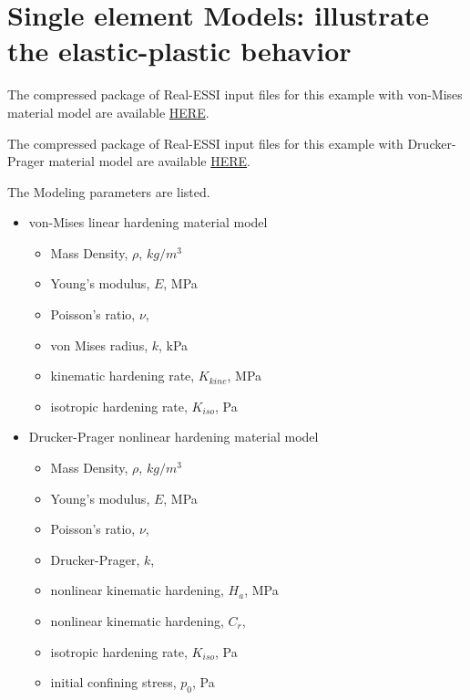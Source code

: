 \clearpage
\newpage
\section{Single element Models: illustrate the elastic-plastic behavior}
\label{Single_element_Models_illustrate_the_elastic-plastic_behavior}

The compressed package of Real-ESSI input files for this example with von-Mises material model are available 
\href{http://cml01.engr.ucdavis.edu/shortCourse/Day1/Single_element_Models_illustrate_the_elastic-plastic_behavior/vonMises/vonMises.tgz}{HERE}. 

The compressed package of Real-ESSI input files for this example with Drucker-Prager material model are available 
\href{http://cml01.engr.ucdavis.edu/shortCourse/Day1/Single_element_Models_illustrate_the_elastic-plastic_behavior/DruckerPrager/DruckerPrager.tgz}{HERE}. 



The Modeling parameters are listed.
\begin{itemize}
  \item von-Mises linear hardening material model 
  \begin{itemize}
    \item Mass Density, $\rho$, \enspace {} $kg/m^3$
    \item Young's modulus, $E$, \enspace {} MPa
    \item Poisson's ratio, $\nu$, \enspace {}
    \item von Mises radius, $k$, \enspace {} kPa
    \item kinematic hardening rate, $K_{kine} $, \enspace {} MPa
    \item isotropic hardening rate, $K_{iso} $, \enspace {} Pa
  \end{itemize}
  \item Drucker-Prager nonlinear hardening material model 
  \begin{itemize}
    \item Mass Density, $\rho$, \enspace {} $kg/m^3$
    \item Young's modulus, $E$, \enspace {} MPa
    \item Poisson's ratio, $\nu$, \enspace {}
    \item Drucker-Prager, $k$, \enspace {}
    \item nonlinear kinematic hardening, $H_a$, \enspace {} MPa
    \item nonlinear kinematic hardening, $C_r$, \enspace {}
    \item isotropic hardening rate, $K_{iso} $, \enspace {} Pa
    \item initial confining stress, $p_0$, \enspace {} Pa
  \end{itemize}
\end{itemize}


